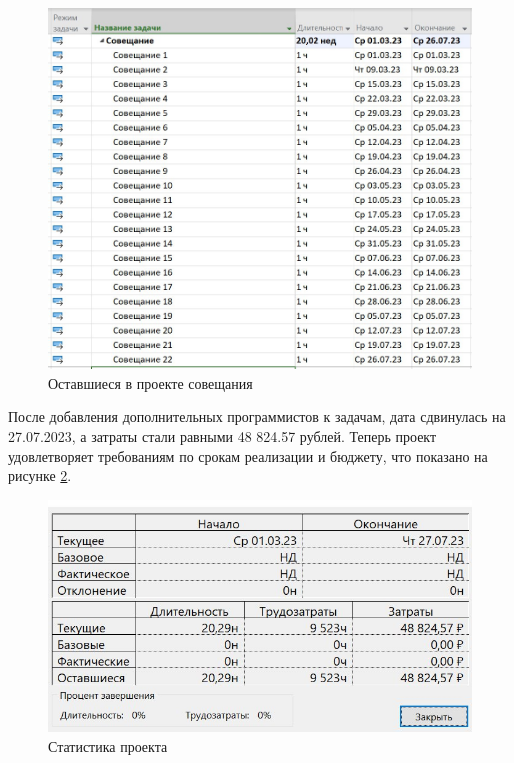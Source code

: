 \begin{figure}[H]
	\begin{center}
		\includegraphics[scale=0.3]{inc/img/task3-delete.jpg}
	\end{center}
	\captionsetup{justification=centering}
	\caption{Оставшиеся в проекте совещания}
	\label{img:task3-delete}
\end{figure}

После добавления дополнительных программистов к задачам, дата сдвинулась на 27.07.2023, а затраты стали равными 48 824.57 рублей. Теперь проект удовлетворяет требованиям по срокам реализации и бюджету, что показано на рисунке \ref{img:task3-final}.

\begin{figure}[H]
	\begin{center}
		\includegraphics[scale=0.3]{inc/img/task3-final.jpg}
	\end{center}
	\captionsetup{justification=centering}
	\caption{Статистика проекта}
	\label{img:task3-final}
\end{figure}

